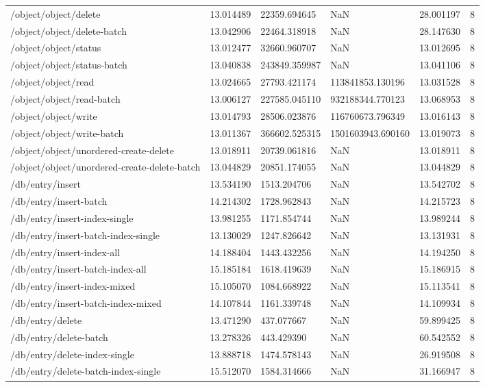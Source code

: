 \begin{tabularx}{\linewidth}{XXXXXX}
/object/object/delete & 13.014489 & 22359.694645 & NaN & 28.001197 & 8 \\
/object/object/delete-batch & 13.042906 & 22464.318918 & NaN & 28.147630 & 8 \\
/object/object/status & 13.012477 & 32660.960707 & NaN & 13.012695 & 8 \\
/object/object/status-batch & 13.040838 & 243849.359987 & NaN & 13.041106 & 8 \\
/object/object/read & 13.024665 & 27793.421174 & 113841853.130196 & 13.031528 & 8 \\
/object/object/read-batch & 13.006127 & 227585.045110 & 932188344.770123 & 13.068953 & 8 \\
/object/object/write & 13.014793 & 28506.023876 & 116760673.796349 & 13.016143 & 8 \\
/object/object/write-batch & 13.011367 & 366602.525315 & 1501603943.690160 & 13.019073 & 8 \\
/object/object/unordered-create-delete & 13.018911 & 20739.061816 & NaN & 13.018911 & 8 \\
/object/object/unordered-create-delete-batch & 13.044829 & 20851.174055 & NaN & 13.044829 & 8 \\
/db/entry/insert & 13.534190 & 1513.204706 & NaN & 13.542702 & 8 \\
/db/entry/insert-batch & 14.214302 & 1728.962843 & NaN & 14.215723 & 8 \\
/db/entry/insert-index-single & 13.981255 & 1171.854744 & NaN & 13.989244 & 8 \\
/db/entry/insert-batch-index-single & 13.130029 & 1247.826642 & NaN & 13.131931 & 8 \\
/db/entry/insert-index-all & 14.188404 & 1443.432256 & NaN & 14.194250 & 8 \\
/db/entry/insert-batch-index-all & 15.185184 & 1618.419639 & NaN & 15.186915 & 8 \\
/db/entry/insert-index-mixed & 15.105070 & 1084.668922 & NaN & 15.113541 & 8 \\
/db/entry/insert-batch-index-mixed & 14.107844 & 1161.339748 & NaN & 14.109934 & 8 \\
/db/entry/delete & 13.471290 & 437.077667 & NaN & 59.899425 & 8 \\
/db/entry/delete-batch & 13.278326 & 443.429390 & NaN & 60.542552 & 8 \\
/db/entry/delete-index-single & 13.888718 & 1474.578143 & NaN & 26.919508 & 8 \\
/db/entry/delete-batch-index-single & 15.512070 & 1584.314666 & NaN & 31.166947 & 8 \\

\end{tabularx}
